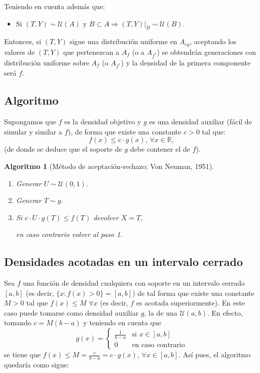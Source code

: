 \documentclass[
  spanish,
  10pt,
]{book}
\providecommand{\tightlist}{%
  \setlength{\itemsep}{0pt}\setlength{\parskip}{0pt}}
\theoremstyle{break}
\newtheorem{conjecture}{Algoritmo}[chapter]
\theoremstyle{nonumberplain}
\begin{document}
Teniendo en cuenta además que:

\begin{itemize}
\tightlist
\item
  Si \(\left( T,Y\right) \sim \mathcal{U}\left( A\right)\) y
  \(B \subset A\Rightarrow \left. \left( T,Y\right) \right\vert _{B}
  \sim \mathcal{U}\left(B\right)\).
\end{itemize}

Entonces, si \(\left( T, Y \right)\) sigue una distribución uniforme en \(A_{cg}\), aceptando los valores de \(\left( T, Y \right)\) que pertenezcan a \(A_{f}\) (o a \(A_{f^{\ast}}\)) se obtendrán generaciones con distribución uniforme sobre \(A_{f}\) (o \(A_{f^{\ast}}\)) y la densidad de la primera componente será \(f\).

\subsection{Algoritmo}\label{algoritmo}

Supongamos que \(f\) es la densidad objetivo y \(g\) es una densidad
auxiliar (fácil de simular y similar a \(f\)), de forma que
existe una constante \(c>0\) tal que:
\[f(x) \leq c\cdot g(x) 
\text{, }\forall x\in \mathbb{R},\]
(de donde se deduce que el soporte de \(g\) debe contener el de \(f\)).

\begin{conjecture}[Método de aceptación-rechazo; Von Neuman, 1951]
\protect\hypertarget{cnj:aceptacion-rechazo}{}\label{cnj:aceptacion-rechazo}

\begin{enumerate}
\def\labelenumi{\arabic{enumi}.}
\item
  Generar \(U \sim \mathcal{U}(0, 1)\).
\item
  Generar \(T \sim g\).
\item
  Si \(c\cdot U\cdot g(T) \leq f(T)\)
  devolver \(X=T\),

  en caso contrario volver al paso 1.
\end{enumerate}

\end{conjecture}

\subsection{Densidades acotadas en un intervalo cerrado}\label{densidades-acotadas-en-un-intervalo-cerrado}

Sea \(f\) una función de densidad cualquiera con soporte en un intervalo cerrado \([a,b]\) (es decir, \(\{x : f(x) > 0\}=[a,b]\)) de tal forma que existe una constante \(M>0\) tal que \(f(x) \leq M\) \(\forall x\) (es decir, \(f\) es acotada superiormente).
En este caso puede tomarse como densidad auxiliar \(g\), la de una \(\mathcal{U}(a,b)\).
En efecto, tomando \(c = M\left( b-a\right)\) y teniendo en cuenta que
\[g(x) = \left\{
\begin{array}{ll}\frac{1}{b-a} & \text{si } x \in [a,b]\\
0 & \text{en caso contrario}
\end{array} \right.\]
se tiene que \(f(x) \leq M = \frac{c}{b-a}=c \cdot g(x)\),
\(\forall x \in [a,b]\).
Así pues, el algoritmo quedaría como sigue:
\end{document}

